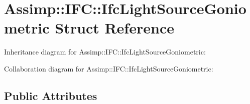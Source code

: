 \hypertarget{struct_assimp_1_1_i_f_c_1_1_ifc_light_source_goniometric}{\section{Assimp\+:\+:I\+F\+C\+:\+:Ifc\+Light\+Source\+Goniometric Struct Reference}
\label{struct_assimp_1_1_i_f_c_1_1_ifc_light_source_goniometric}
}


Inheritance diagram for Assimp\+:\+:I\+F\+C\+:\+:Ifc\+Light\+Source\+Goniometric\+:


Collaboration diagram for Assimp\+:\+:I\+F\+C\+:\+:Ifc\+Light\+Source\+Goniometric\+:
\subsection*{Public Attributes}
